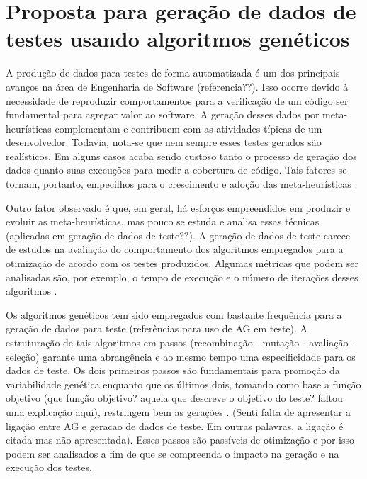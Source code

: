 \chapter[Proposta para geração de dados de testes usando algoritmos
genéticos]{Proposta para geração de dados de testes usando algoritmos genéticos}
\label{propostaestudo}

A produção de dados para testes de forma automatizada é um dos principais avanços na área de Engenharia de Software (referencia??). Isso ocorre devido à necessidade de reproduzir comportamentos para a verificação de um código ser fundamental para agregar valor ao software. A geração desses dados por meta-heurísticas complementam e contribuem com as atividades típicas de um desenvolvedor. Todavia, nota-se que nem sempre esses testes gerados são realísticos. Em alguns casos acaba sendo custoso tanto o processo de geração dos dados quanto suas execuções para medir a cobertura de código.  Tais fatores se tornam, portanto, empecilhos para o crescimento e adoção das meta-heurísticas \cite{harman2015achievements}.

Outro fator observado é que, em geral, há esforços empreendidos em produzir e evoluir as meta-heurísticas, mas pouco se estuda e analisa essas técnicas (aplicadas em geração de dados de teste??). A geração de dados de teste carece de estudos na avaliação do comportamento dos algoritmos empregados para a otimização de acordo com os testes produzidos. Algumas métricas que podem ser analisadas são, por exemplo, o tempo de execução e o número de iterações desses algoritmos \cite{rodrigues2018using}. 

Os algoritmos genéticos tem sido empregados com bastante frequência para a geração de dados para teste (referências para uso de AG em teste). A estruturação de tais algoritmos em passos (recombinação - mutação - avaliação - seleção) garante uma abrangência e ao mesmo tempo uma especificidade para os dados de teste. Os dois primeiros passos são fundamentais para promoção da variabilidade genética enquanto que os últimos dois, tomando como base a função objetivo (que função objetivo? aquela que descreve o objetivo do teste? faltou uma explicação aqui), restringem bem as gerações \cite{rodrigues2018using}.  (Senti falta de apresentar a ligação entre AG e geracao de dados de teste. Em outras palavras, a ligação é citada mas não apresentada).  Esses passos são passíveis de otimização e por isso podem ser analisados a fim de que se compreenda o impacto na geração e na execução dos testes.


